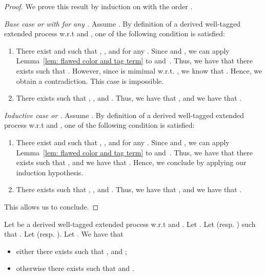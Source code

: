 \begin{proof}
We prove this result by induction on 
with the order .

\smallskip{}

\noindent \emph{Base case  or  with  for any .} Assume .
By definition of a derived well-tagged extended process w.r.t  and , one of the
following condition is satisfied:
\begin{enumerate}
\item There exist  and  such that , , and  for any .  Since  and , we can apply Lemma~\ref{lem: flawed color and tag term}
 to  and~. Thus, we have that there exists  such that . However, since  is mimimal w.r.t. ,
we know that .   Hence, we obtain a
contradiction. This case is impossible.
\item There exists  such that , , and . Thus, we have that , and we
  have that .
\end{enumerate}

\medskip{}

\noindent \emph{Inductive case  or .} Assume .
By definition of a derived well-tagged extended process w.r.t  and , one of the
following condition is satisfied:
\begin{enumerate}
\item There exist  and  such that , , and  for any .  Since  and , we can apply Lemma~\ref{lem: flawed color and tag term}
 to  and~. Thus, we have that there exists  such that , and we have that .
Hence, we conclude by applying our induction hypothesis.
\item There exists  such that , , and . Thus, we have that , and we
  have that .
\end{enumerate}
This allows us to conclude.
\end{proof}



\begin{lemma}
  \label{lem:FlawedColor and frame element direct element}
  Let  be a derived well-tagged extended process w.r.t  and . Let . Let  (resp. ) such that . Let  (resp. ). Let . We have that 
  \begin{itemize}
  \item either there exists  such that ,  and ; 
  \item otherwise there exists  such that  and .
  \end{itemize}
\end{lemma}

